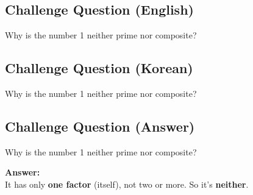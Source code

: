 \cleardoublepage
\subsection*{Challenge Question (English)}
Why is the number 1 neither prime nor composite?


\newpage
\subsection*{Challenge Question (Korean)}
Why is the number 1 neither prime nor composite?


\newpage
\subsection*{Challenge Question (Answer)}
Why is the number 1 neither prime nor composite?

\textbf{Answer:}\\
It has only \textbf{one factor} (itself), not two or more. So it's \textbf{neither}.

